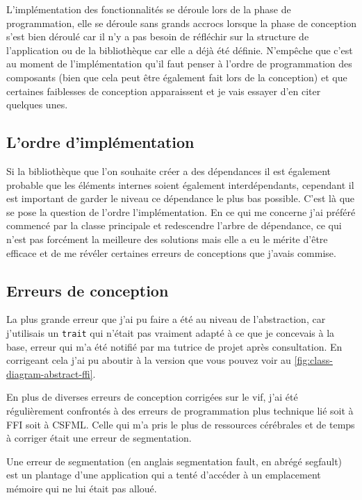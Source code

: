 \documentclass[11pt,a4paper,krantz2,11pt,oneside]{krantz}
\renewenvironment{quote}{\begin{VF}}{\end{VF}}
\begin{document}
L'implémentation des fonctionnalités se déroule lors de la phase de programmation, elle se déroule sans grands accrocs lorsque la phase de conception s'est bien déroulé car il n'y a pas besoin de réfléchir sur la structure de l'application ou de la bibliothèque car elle a déjà été définie. N'empêche que c'est au moment de l'implémentation qu'il faut penser à l'ordre de programmation des composants (bien que cela peut être également fait lors de la conception) et que certaines faiblesses de conception apparaissent et je vais essayer d'en citer quelques unes.

\hypertarget{lordre-dimpluxe9mentation}{%
\subsection{L'ordre d'implémentation}\label{lordre-dimpluxe9mentation}}

Si la bibliothèque que l'on souhaite créer a des dépendances il est également probable que les éléments internes soient également interdépendants, cependant il est important de garder le niveau ce dépendance le plus bas possible. C'est là que se pose la question de l'ordre l'implémentation. En ce qui me concerne j'ai préféré commencé par la classe principale et redescendre l'arbre de dépendance, ce qui n'est pas forcément la meilleure des solutions mais elle a eu le mérite d'être efficace et de me révéler certaines erreurs de conceptions que j'avais commise.

\hypertarget{erreurs-de-conception}{%
\subsection{Erreurs de conception}\label{erreurs-de-conception}}

La plus grande erreur que j'ai pu faire a été au niveau de l'abstraction, car j'utilisais un \texttt{trait} qui n'était pas vraiment adapté à ce que je concevais à la base, erreur qui m'a été notifié par ma tutrice de projet après consultation. En corrigeant cela j'ai pu aboutir à la version que vous pouvez voir au \ref{fig:class-diagram-abstract-ffi}.

En plus de diverses erreurs de conception corrigées sur le vif, j'ai été régulièrement confrontés à des erreurs de programmation plus technique lié soit à FFI soit à CSFML. Celle qui m'a pris le plus de ressources cérébrales et de temps à corriger était une erreur de segmentation.

\begin{quote}
Une erreur de segmentation (en anglais segmentation fault, en abrégé segfault) est un plantage d'une application qui a tenté d'accéder à un emplacement mémoire qui ne lui était pas alloué.

\end{quote}
\end{document}
